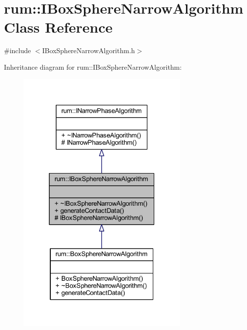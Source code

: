 \hypertarget{classrum_1_1_i_box_sphere_narrow_algorithm}{}\section{rum\+:\+:I\+Box\+Sphere\+Narrow\+Algorithm Class Reference}
\label{classrum_1_1_i_box_sphere_narrow_algorithm}


{\ttfamily \#include $<$I\+Box\+Sphere\+Narrow\+Algorithm.\+h$>$}



Inheritance diagram for rum\+:\+:I\+Box\+Sphere\+Narrow\+Algorithm\+:\nopagebreak
\begin{figure}[H]
\begin{center}
\leavevmode
\includegraphics[width=241pt]{classrum_1_1_i_box_sphere_narrow_algorithm__inherit__graph}
\end{center}
\end{figure}


